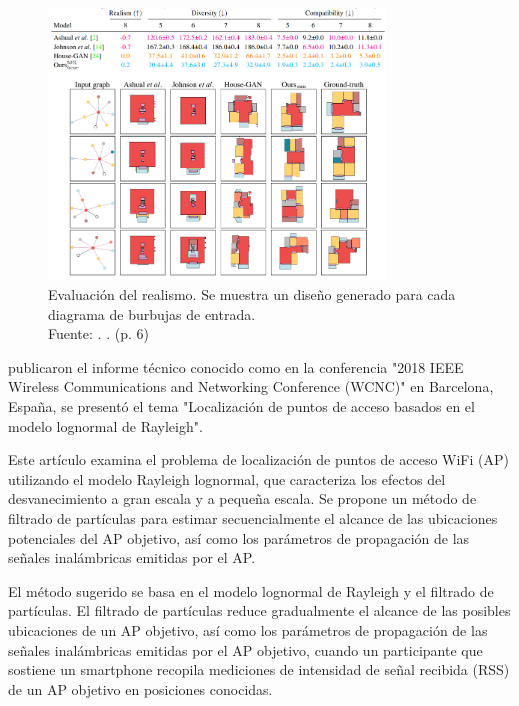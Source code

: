 \begin{figure}[!ht]
	\begin{center}
		\includegraphics[width=0.8\textwidth]{2/figures/nauata2021_2.png}
		\caption[Evaluación del realismo. Se muestra un diseño generado para cada diagrama de burbujas de entrada]{Evaluación del realismo. Se muestra un diseño generado para cada diagrama de burbujas de entrada.\\
			Fuente: \cite{pr_nauata2021housegan}. . (p. 6)}
		\label{2:fig118}
	\end{center}
\end{figure}

\clearpage
\cite{pr_shen2018localaplognor} publicaron el informe técnico conocido como  en la conferencia "2018 IEEE Wireless Communications and Networking Conference (WCNC)" en Barcelona, España, se presentó el tema "Localización de puntos de acceso basados en el modelo lognormal de Rayleigh".

Este artículo examina el problema de localización de puntos de acceso WiFi (AP) utilizando el modelo Rayleigh lognormal, que caracteriza los efectos del desvanecimiento a gran escala y a pequeña escala. Se propone un método de filtrado de partículas para estimar secuencialmente el alcance de las ubicaciones potenciales del AP objetivo, así como los parámetros de propagación de las señales inalámbricas emitidas por el AP.

El método sugerido se basa en el modelo lognormal de Rayleigh y el filtrado de partículas. El filtrado de partículas reduce gradualmente el alcance de las posibles ubicaciones de un AP objetivo, así como los parámetros de propagación de las señales inalámbricas emitidas por el AP objetivo, cuando un participante que sostiene un smartphone recopila mediciones de intensidad de señal recibida (RSS) de un AP objetivo en posiciones conocidas.


